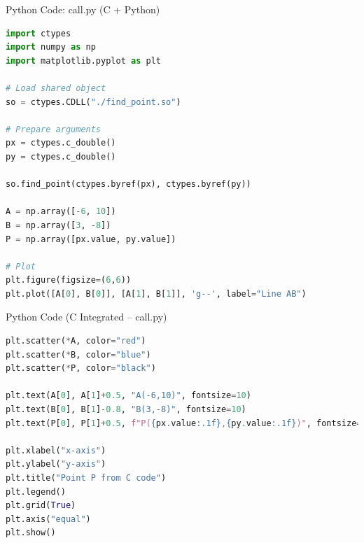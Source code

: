 \documentclass{beamer}
\begin{document}
\begin{frame}[fragile]{Python Code: call.py (C + Python)}
\begin{lstlisting}[language=Python]
import ctypes
import numpy as np
import matplotlib.pyplot as plt

# Load shared object
so = ctypes.CDLL("./find_point.so")

# Prepare arguments
px = ctypes.c_double()
py = ctypes.c_double()

so.find_point(ctypes.byref(px), ctypes.byref(py))

A = np.array([-6, 10])
B = np.array([3, -8])
P = np.array([px.value, py.value])

# Plot
plt.figure(figsize=(6,6))
plt.plot([A[0], B[0]], [A[1], B[1]], 'g--', label="Line AB")
\end{lstlisting}
\end{frame}

\begin{frame}[fragile]{Python Code (C Integrated – call.py)
}
\begin{lstlisting}[language=Python]
plt.scatter(*A, color="red")
plt.scatter(*B, color="blue")
plt.scatter(*P, color="black")

plt.text(A[0], A[1]+0.5, "A(-6,10)", fontsize=10)
plt.text(B[0], B[1]-0.8, "B(3,-8)", fontsize=10)
plt.text(P[0], P[1]+0.5, f"P({px.value:.1f},{py.value:.1f})", fontsize=10)

plt.xlabel("x-axis")
plt.ylabel("y-axis")
plt.title("Point P from C code")
plt.legend()
plt.grid(True)
plt.axis("equal")
plt.show()
\end{lstlisting}
\end{frame}
\end{document}
